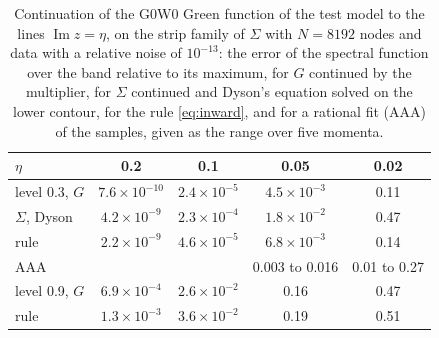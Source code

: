\documentclass[aps,prb,reprint,a4paper]{revtex4-2}
\DeclareMathOperator{\Imag}{Im}
\begin{document}
\begin{table}[t]
\caption{Continuation of the G0W0 Green function of the test model to the lines $\Imag z=\eta$, on the strip family of $\Sigma$ with $N=8192$ nodes and data with a relative noise of $10^{-13}$: the error of the spectral function over the band relative to its maximum, for $G$ continued by the multiplier, for $\Sigma$ continued and Dyson's equation solved on the lower contour, for the rule \eqref{eq:inward}, and for a rational fit (AAA) of the samples, given as the range over five momenta.}
\label{tab:continuation}
\centering\footnotesize
\setlength{\tabcolsep}{3pt}
\begin{tabular}{@{}lcccc@{}}
\toprule
$\eta$ & 0.2 & 0.1 & 0.05 & 0.02 \\
\midrule
level 0.3, $G$ & $7.6\times10^{-10}$ & $2.4\times10^{-5}$ & $4.5\times10^{-3}$ & 0.11 \\
\quad $\Sigma$, Dyson & $4.2\times10^{-9}$ & $2.3\times10^{-4}$ & $1.8\times10^{-2}$ & 0.47 \\
\quad rule & $2.2\times10^{-9}$ & $4.6\times10^{-5}$ & $6.8\times10^{-3}$ & 0.14 \\
\quad AAA & & & 0.003 to 0.016 & 0.01 to 0.27 \\
level 0.9, $G$ & $6.9\times10^{-4}$ & $2.6\times10^{-2}$ & 0.16 & 0.47 \\
\quad rule & $1.3\times10^{-3}$ & $3.6\times10^{-2}$ & 0.19 & 0.51 \\
\bottomrule
\end{tabular}
\end{table}
\end{document}
